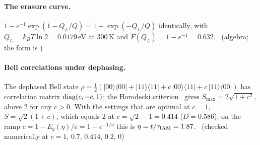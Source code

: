 \paragraph{The erasure curve.} $1-e^{-1}\exp(1-Q_L/Q)=1-\exp(-Q_L/Q)$ identically, with $Q_L=k_BT\ln2=0.0179$\,eV at 300\,K and $F(Q_L)=1-e^{-1}=0.632$.
\derived\ (algebra; the form is \conjecture)

\paragraph{Bell correlations under dephasing.} The dephased Bell state $\rho=\tfrac12(|00\rangle\langle00|+|11\rangle\langle11|+c\,|00\rangle\langle11|+c\,|11\rangle\langle00|)$ has
correlation matrix ${\rm diag}(c,-c,1)$; the Horodecki criterion~\cite{Horodecki1995} gives $S_{\max}=2\sqrt{1+c^2}$, above $2$ for any $c>0$. With the settings
that are optimal at $c=1$, $S=\sqrt2(1+c)$, which equals $2$ at $c=\sqrt2-1=0.414$ ($D=0.586$); on the ramp $c=1-E_q(\eta)/e=1-e^{-1/\eta}$ this is
$\eta=t/\tau_{\rm IAM}=1.87$. \derived\ (checked numerically at $c=1$, $0.7$, $0.414$, $0.2$, $0$)

